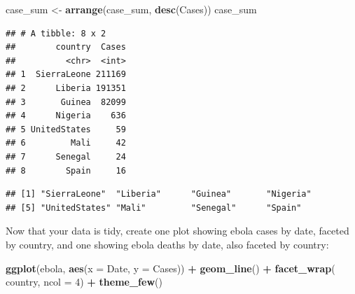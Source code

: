 \documentclass[]{book}
\makeatletter
\newenvironment{Shaded}{\begin{snugshade}}{\end{snugshade}}
\newcommand{\KeywordTok}[1]{\textcolor[rgb]{0.13,0.29,0.53}{\textbf{#1}}}
\newcommand{\DataTypeTok}[1]{\textcolor[rgb]{0.13,0.29,0.53}{#1}}
\newcommand{\DecValTok}[1]{\textcolor[rgb]{0.00,0.00,0.81}{#1}}
\newcommand{\StringTok}[1]{\textcolor[rgb]{0.31,0.60,0.02}{#1}}
\newcommand{\OperatorTok}[1]{\textcolor[rgb]{0.81,0.36,0.00}{\textbf{#1}}}
\newcommand{\NormalTok}[1]{#1}
\newenvironment{kframe}{%
\medskip{}
\setlength{\fboxsep}{.8em}
 \def\at@end@of@kframe{}%
 \ifinner\ifhmode%
  \def\at@end@of@kframe{\end{minipage}}%
  \begin{minipage}{\columnwidth}%
 \fi\fi%
 \def\FrameCommand##1{\hskip\@totalleftmargin \hskip-\fboxsep
 \colorbox{shadecolor}{##1}\hskip-\fboxsep
     \hskip-\linewidth \hskip-\@totalleftmargin \hskip\columnwidth}%
 \MakeFramed {\advance\hsize-\width
   \@totalleftmargin\z@ \linewidth\hsize
   \@setminipage}}%
 {\par\unskip\endMakeFramed%
 \at@end@of@kframe}
\renewenvironment{Shaded}{\begin{kframe}}{\end{kframe}}
\theoremstyle{definition}
\theoremstyle{definition}
\theoremstyle{definition}
\theoremstyle{remark}
\makeatother
\begin{document}
\begin{Shaded}
\begin{Highlighting}[]
\NormalTok{case_sum <-}\StringTok{ }\KeywordTok{arrange}\NormalTok{(case_sum, }\KeywordTok{desc}\NormalTok{(Cases))}
\NormalTok{case_sum}
\end{Highlighting}
\end{Shaded}

\begin{verbatim}
## # A tibble: 8 x 2
##        country  Cases
##          <chr>  <int>
## 1  SierraLeone 211169
## 2      Liberia 191351
## 3       Guinea  82099
## 4      Nigeria    636
## 5 UnitedStates     59
## 6         Mali     42
## 7      Senegal     24
## 8        Spain     16
\end{verbatim}

\begin{Shaded}
\end{Shaded}

\begin{verbatim}
## [1] "SierraLeone"  "Liberia"      "Guinea"       "Nigeria"     
## [5] "UnitedStates" "Mali"         "Senegal"      "Spain"
\end{verbatim}

Now that your data is tidy, create one plot showing ebola cases by date,
faceted by country, and one showing ebola deaths by date, also faceted
by country:

\begin{Shaded}
\begin{Highlighting}[]
\KeywordTok{ggplot}\NormalTok{(ebola, }\KeywordTok{aes}\NormalTok{(}\DataTypeTok{x =}\NormalTok{ Date, }\DataTypeTok{y =}\NormalTok{ Cases)) }\OperatorTok{+}\StringTok{ }
\StringTok{        }\KeywordTok{geom_line}\NormalTok{() }\OperatorTok{+}\StringTok{ }
\StringTok{        }\KeywordTok{facet_wrap}\NormalTok{(}\OperatorTok{~}\StringTok{ }\NormalTok{country, }\DataTypeTok{ncol =} \DecValTok{4}\NormalTok{) }\OperatorTok{+}\StringTok{ }
\StringTok{        }\KeywordTok{theme_few}\NormalTok{()}
\end{Highlighting}
\end{Shaded}
\end{document}
